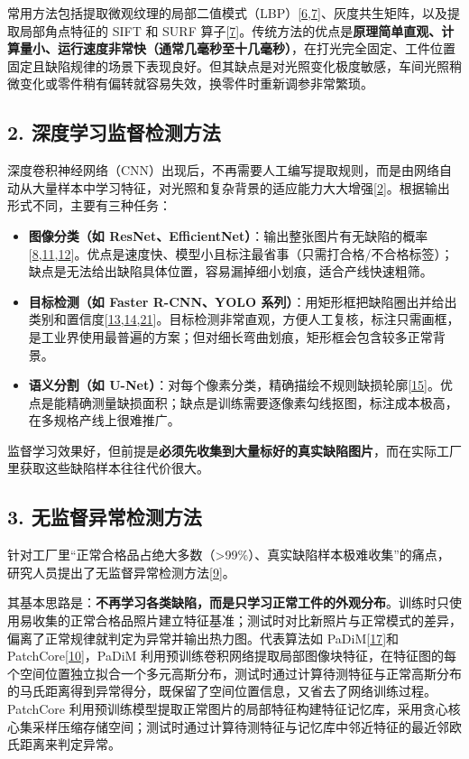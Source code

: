 常用方法包括提取微观纹理的局部二值模式（LBP）[\hyperlink{ref:6}{6},\hyperlink{ref:7}{7}]、灰度共生矩阵，以及提取局部角点特征的 SIFT 和 SURF 算子[\hyperlink{ref:7}{7}]。传统方法的优点是\textbf{原理简单直观、计算量小、运行速度非常快（通常几毫秒至十几毫秒）}，在打光完全固定、工件位置固定且缺陷规律的场景下表现良好。但其缺点是对光照变化极度敏感，车间光照稍微变化或零件稍有偏转就容易失效，换零件时重新调参非常繁琐。

\subsection*{2. 深度学习监督检测方法}
深度卷积神经网络（CNN）出现后，不再需要人工编写提取规则，而是由网络自动从大量样本中学习特征，对光照和复杂背景的适应能力大大增强[\hyperlink{ref:2}{2}]。根据输出形式不同，主要有三种任务：
\begin{itemize}
\item \textbf{图像分类（如 ResNet、EfficientNet）}：输出整张图片有无缺陷的概率[\hyperlink{ref:8}{8},\hyperlink{ref:11}{11},\hyperlink{ref:12}{12}]。优点是速度快、模型小且标注最省事（只需打合格/不合格标签）；缺点是无法给出缺陷具体位置，容易漏掉细小划痕，适合产线快速粗筛。
\item \textbf{目标检测（如 Faster R-CNN、YOLO 系列）}：用矩形框把缺陷圈出并给出类别和置信度[\hyperlink{ref:13}{13},\hyperlink{ref:14}{14},\hyperlink{ref:21}{21}]。目标检测非常直观，方便人工复核，标注只需画框，是工业界使用最普遍的方案；但对细长弯曲划痕，矩形框会包含较多正常背景。
\item \textbf{语义分割（如 U-Net）}：对每个像素分类，精确描绘不规则缺损轮廓[\hyperlink{ref:15}{15}]。优点是能精确测量缺损面积；缺点是训练需要逐像素勾线抠图，标注成本极高，在多规格产线上很难推广。

\end{itemize}
监督学习效果好，但前提是\textbf{必须先收集到大量标好的真实缺陷图片}，而在实际工厂里获取这些缺陷样本往往代价很大。

\subsection*{3. 无监督异常检测方法}
针对工厂里“正常合格品占绝大多数（>99\%）、真实缺陷样本极难收集”的痛点，研究人员提出了无监督异常检测方法[\hyperlink{ref:9}{9}]。

其基本思路是：\textbf{不再学习各类缺陷，而是只学习正常工件的外观分布}。训练时只使用易收集的正常合格品照片建立特征基准；测试时对比新照片与正常模式的差异，偏离了正常规律就判定为异常并输出热力图。代表算法如 PaDiM[\hyperlink{ref:17}{17}]和 PatchCore[\hyperlink{ref:10}{10}]，PaDiM 利用预训练卷积网络提取局部图像块特征，在特征图的每个空间位置独立拟合一个多元高斯分布，测试时通过计算待测特征与正常高斯分布的马氏距离得到异常得分，既保留了空间位置信息，又省去了网络训练过程。PatchCore 利用预训练模型提取正常图片的局部特征构建特征记忆库，采用贪心核心集采样压缩存储空间；测试时通过计算待测特征与记忆库中邻近特征的最近邻欧氏距离来判定异常。

